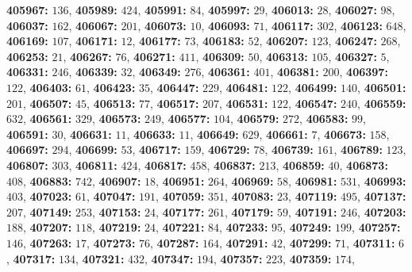 \textsf{\bfseries 405967:} $136$, \textsf{\bfseries 405989:} $424$, \textsf{\bfseries 405991:} $84$, \textsf{\bfseries 405997:} $29$, \textsf{\bfseries 406013:} $28$, \textsf{\bfseries 406027:} $98$, \textsf{\bfseries 406037:} $162$, \textsf{\bfseries 406067:} $201$, \textsf{\bfseries 406073:} $10$, \textsf{\bfseries 406093:} $71$, \textsf{\bfseries 406117:} $302$, \textsf{\bfseries 406123:} $648$, \textsf{\bfseries 406169:} $107$, \textsf{\bfseries 406171:} $12$, \textsf{\bfseries 406177:} $73$, \textsf{\bfseries 406183:} $52$, \textsf{\bfseries 406207:} $123$, \textsf{\bfseries 406247:} $268$, \textsf{\bfseries 406253:} $21$, \textsf{\bfseries 406267:} $76$, \textsf{\bfseries 406271:} $411$, \textsf{\bfseries 406309:} $50$, \textsf{\bfseries 406313:} $105$, \textsf{\bfseries 406327:} $5$, \textsf{\bfseries 406331:} $246$, \textsf{\bfseries 406339:} $32$, \textsf{\bfseries 406349:} $276$, \textsf{\bfseries 406361:} $401$, \textsf{\bfseries 406381:} $200$, \textsf{\bfseries 406397:} $122$, \textsf{\bfseries 406403:} $61$, \textsf{\bfseries 406423:} $35$, \textsf{\bfseries 406447:} $229$, \textsf{\bfseries 406481:} $122$, \textsf{\bfseries 406499:} $140$, \textsf{\bfseries 406501:} $201$, \textsf{\bfseries 406507:} $45$, \textsf{\bfseries 406513:} $77$, \textsf{\bfseries 406517:} $207$, \textsf{\bfseries 406531:} $122$, \textsf{\bfseries 406547:} $240$, \textsf{\bfseries 406559:} $632$, \textsf{\bfseries 406561:} $329$, \textsf{\bfseries 406573:} $249$, \textsf{\bfseries 406577:} $104$, \textsf{\bfseries 406579:} $272$, \textsf{\bfseries 406583:} $99$, \textsf{\bfseries 406591:} $30$, \textsf{\bfseries 406631:} $11$, \textsf{\bfseries 406633:} $11$, \textsf{\bfseries 406649:} $629$, \textsf{\bfseries 406661:} $7$, \textsf{\bfseries 406673:} $158$, \textsf{\bfseries 406697:} $294$, \textsf{\bfseries 406699:} $53$, \textsf{\bfseries 406717:} $159$, \textsf{\bfseries 406729:} $78$, \textsf{\bfseries 406739:} $161$, \textsf{\bfseries 406789:} $123$, \textsf{\bfseries 406807:} $303$, \textsf{\bfseries 406811:} $424$, \textsf{\bfseries 406817:} $458$, \textsf{\bfseries 406837:} $213$, \textsf{\bfseries 406859:} $40$, \textsf{\bfseries 406873:} $408$, \textsf{\bfseries 406883:} $742$, \textsf{\bfseries 406907:} $18$, \textsf{\bfseries 406951:} $264$, \textsf{\bfseries 406969:} $58$, \textsf{\bfseries 406981:} $531$, \textsf{\bfseries 406993:} $403$, \textsf{\bfseries 407023:} $61$, \textsf{\bfseries 407047:} $191$, \textsf{\bfseries 407059:} $351$, \textsf{\bfseries 407083:} $23$, \textsf{\bfseries 407119:} $495$, \textsf{\bfseries 407137:} $207$, \textsf{\bfseries 407149:} $253$, \textsf{\bfseries 407153:} $24$, \textsf{\bfseries 407177:} $261$, \textsf{\bfseries 407179:} $59$, \textsf{\bfseries 407191:} $246$, \textsf{\bfseries 407203:} $188$, \textsf{\bfseries 407207:} $118$, \textsf{\bfseries 407219:} $24$, \textsf{\bfseries 407221:} $84$, \textsf{\bfseries 407233:} $95$, \textsf{\bfseries 407249:} $199$, \textsf{\bfseries 407257:} $146$, \textsf{\bfseries 407263:} $17$, \textsf{\bfseries 407273:} $76$, \textsf{\bfseries 407287:} $164$, \textsf{\bfseries 407291:} $42$, \textsf{\bfseries 407299:} $71$, \textsf{\bfseries 407311:} $6$, \textsf{\bfseries 407317:} $134$, \textsf{\bfseries 407321:} $432$, \textsf{\bfseries 407347:} $194$, \textsf{\bfseries 407357:} $223$, \textsf{\bfseries 407359:} $174$, 
